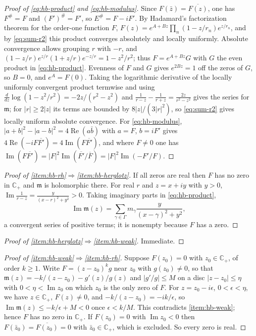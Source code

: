 \documentclass[11pt]{amsart}
\theoremstyle{plain}
\theoremstyle{definition}
\theoremstyle{remark}
\numberwithin{equation}{section}
\newcommand{\Cp}{\mathbb{C}_{+}}
\DeclareMathOperator{\Ima}{Im}
\DeclareMathOperator{\Rea}{Re}
\renewcommand{\Re}{\Rea}
\renewcommand{\Im}{\Ima}
\begin{document}
\begin{proof}[Proof of \eqref{eq:hb-product} and \eqref{eq:hb-modulus}]
Since $F(\bar z)=\overline{F(z)}$, one has $F^\#=F$ and $(F')^\#=F'$,
so $E^\#=F-iF'$. By Hadamard's factorization theorem for the order-one
function $F$, $F(z)=e^{A+Bz}\prod_n(1-z/r_n)e^{z/r_n}$, and by
\eqref{eq:sum-r2} this product converges absolutely and locally
uniformly. Absolute convergence allows grouping $r$ with $-r$, and
$(1-z/r)e^{z/r}(1+z/r)e^{-z/r}=1-z^2/r^2$; thus $F=e^{A+Bz}G$ with $G$
the even product in \eqref{eq:hb-product}. Evenness of $F$ and $G$ gives
$e^{2Bz}=1$ off the zeros of $G$, so $B=0$, and $e^A=F(0)$. Taking the
logarithmic derivative of the locally uniformly convergent product
termwise and using $\frac{d}{dz}\log(1-z^2/r^2)=-2z/(r^2-z^2)$ and
$\frac1{r-z}-\frac1{r+z}=\frac{2z}{r^2-z^2}$ gives the series for
$\mathfrak m$;
for $|r|\ge2|z|$ its terms are bounded by $8|z|/(3|r|^2)$, so
\eqref{eq:sum-r2} gives locally uniform absolute convergence. For
\eqref{eq:hb-modulus}, $|a+b|^2-|a-b|^2=4\Re(a\bar b)$ with $a=F$,
$b=iF'$ gives $4\Re(-iF\overline{F'})=4\Im(F\overline{F'})$, and where
$F\ne0$ one has $\Im(F\overline{F'})=|F|^2\Im(\overline{F'}/\overline
F)=|F|^2\Im(-F'/F)$.
\end{proof}

\begin{proof}[Proof of
\ref{item:hb-rh}$\Rightarrow$\ref{item:hb-herglotz}]
If all zeros are real then $F$ has no zero in $\Cp$ and $\mathfrak m$
is holomorphic there. For real $r$ and $z=x+iy$ with $y>0$,
$\Im\frac1{r-z}=\frac{y}{(x-r)^2+y^2}>0$. Taking imaginary parts
in \eqref{eq:hb-product},
\[
\Im\mathfrak m(z)=\sum_{\gamma\in\Gamma}m_\gamma
\frac{y}{(x-\gamma)^2+y^2},
\]
a convergent series of positive terms; it is nonempty because $F$ has
a zero.
\end{proof}

\begin{proof}[Proof of
\ref{item:hb-herglotz}$\Rightarrow$\ref{item:hb-weak}]
Immediate.
\end{proof}

\begin{proof}[Proof of \ref{item:hb-weak}$\Rightarrow$\ref{item:hb-rh}]
Suppose $F(z_0)=0$ with $z_0\in\Cp$, of order $k\ge1$. Write
$F=(z-z_0)^kg$ near $z_0$ with $g(z_0)\ne0$, so that
$\mathfrak m(z)=-k/(z-z_0)-g'(z)/g(z)$ and $|g'/g|\le M$ on a disc
$|z-z_0|\le\eta$ with $0<\eta<\Im z_0$ on which $z_0$ is the only zero
of $F$. For $z=z_0-i\epsilon$, $0<\epsilon<\eta$, we have $z\in\Cp$,
$F(z)\ne0$, and $-k/(z-z_0)=-ik/\epsilon$, so
$\Im\mathfrak m(z)\le-k/\epsilon+M<0$ once $\epsilon<k/M$. This
contradicts
\ref{item:hb-weak}; hence $F$ has no zero in $\Cp$. If $F(z_0)=0$ with
$\Im z_0<0$ then $F(\bar z_0)=\overline{F(z_0)}=0$ with $\bar
z_0\in\Cp$, which is excluded. So every zero is real.
\end{proof}
\end{document}
